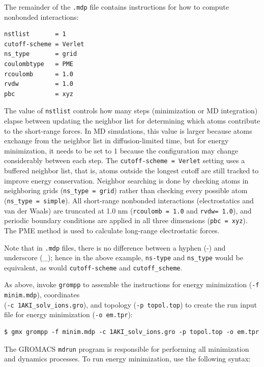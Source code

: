 \documentclass[9pt,tutorial,pubversion]{livecoms}
\begin{document}
The remainder of the \texttt{.mdp} file contains instructions for how to compute nonbonded interactions:

\begin{lstlisting}
nstlist       = 1
cutoff-scheme = Verlet
ns_type       = grid
coulombtype   = PME
rcoulomb      = 1.0
rvdw          = 1.0
pbc           = xyz
\end{lstlisting}

The value of \texttt{nstlist} controls how many steps (minimization or MD integration) elapse between updating the neighbor list for determining which atoms contribute to the short-range forces. In MD simulations, this value is larger because atoms exchange from the neighbor list in diffusion-limited time, but for energy minimization, it needs to be set to 1 because the configuration may change considerably between each step. The \texttt{cutoff-scheme = Verlet} setting uses a buffered neighbor list, that is, atoms outside the longest cutoff are still tracked to improve energy conservation. Neighbor searching is done by checking atoms in neighboring grids (\texttt{ns\_type = grid}) rather than checking every possible atom (\texttt{ns\_type = simple}). All short-range nonbonded interactions (electrostatics and van der Waals) are truncated at 1.0 nm (\texttt{rcoulomb = 1.0} and \texttt{rvdw= 1.0}), and periodic boundary conditions are applied in all three dimensions (\texttt{pbc = xyz}). The PME method is used to calculate long-range electrostatic forces.

Note that in \texttt{.mdp} files, there is no difference between a hyphen (-) and underscore (\_); hence in the above example, \texttt{ns-type} and \texttt{ns\_type} would be equivalent, as would \texttt{cutoff-scheme} and \texttt{cutoff\_scheme}.

As above, invoke \texttt{grompp} to assemble the instructions for energy minimization (\texttt{-f minim.mdp}), coordinates \\(\texttt{-c 1AKI\_solv\_ions.gro}), and topology (\texttt{-p topol.top}) to create the run input file for energy minimization (\texttt{-o em.tpr}):

\begin{lstlisting}
$ gmx grompp -f minim.mdp -c 1AKI_solv_ions.gro -p topol.top -o em.tpr
\end{lstlisting}

The GROMACS \texttt{mdrun} program is responsible for performing all minimization and dynamics processes. To run energy minimization, use the following syntax:
\end{document}

